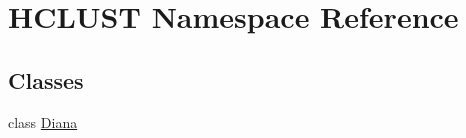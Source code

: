 \hypertarget{namespace_h_c_l_u_s_t}{\section{H\+C\+L\+U\+S\+T Namespace Reference}
\label{namespace_h_c_l_u_s_t}
}
\subsection*{Classes}
\begin{DoxyCompactItemize}
\item 
class \hyperlink{class_h_c_l_u_s_t_1_1_diana}{Diana}
\end{DoxyCompactItemize}
